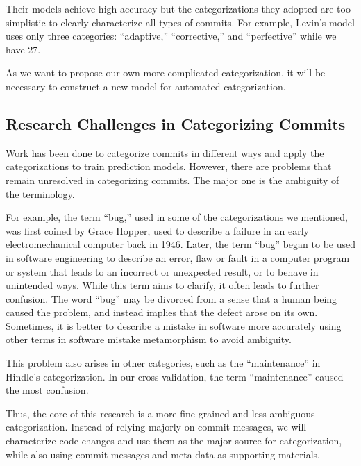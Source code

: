 Their models achieve high accuracy but the categorizations they adopted are too simplistic to clearly characterize all types of commits. 
For example, Levin's model uses only three categories: ``adaptive,'' ``corrective,'' and ``perfective'' while we have 27.

As we want to propose our own more complicated categorization, it will be necessary to construct a new model for automated categorization.

\subsection{Research Challenges in Categorizing Commits}

Work has been done to categorize commits in different ways and apply the categorizations to train prediction models. 
However, there are problems that remain unresolved in categorizing commits.
The major one is the ambiguity of the terminology.

For example, the term ``bug,'' used in some of the categorizations we mentioned, was first coined by Grace Hopper, used to describe a failure in an early electromechanical computer back in 1946. 
Later, the term ``bug'' began to be used in software engineering to describe an error, flaw or fault in a computer program or system that leads to an incorrect or unexpected result, or to behave in unintended ways.
While this term aims to clarify, it often leads to further confusion. 
The word ``bug'' may be divorced from a sense that a human being caused the problem, and instead implies that the defect arose on its own. 
Sometimes, it is better to describe a mistake in software more accurately using other terms in software mistake metamorphism to avoid ambiguity.

This problem also arises in other categories, such as the ``maintenance'' in Hindle's categorization. In our cross validation, the term ``maintenance'' caused the most confusion.

Thus, the core of this research is a more fine-grained and less ambiguous categorization. 
Instead of relying majorly on commit messages, we will characterize code changes and use them as the major source for categorization, while also using commit messages and meta-data as supporting materials.
